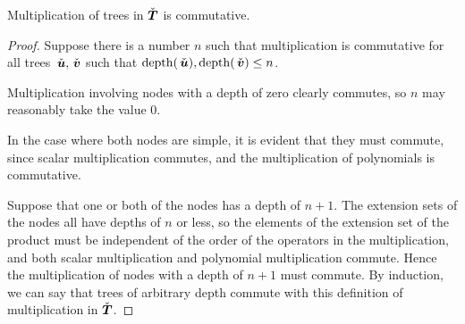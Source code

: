 

\begin{proposition}\label{TMcommutativity}
Multiplication of trees in $\check{\boldsymbol{T}}$ is commutative.
\begin{proof}
  Suppose there is a number $n$ such that multiplication is
  commutative for all trees $\,\check{\boldsymbol{u}}, \,\check{\boldsymbol{v}}$ such that
  $\operatorname{depth}(\,\check{\boldsymbol{u}}), \operatorname{depth}(\,\check{\boldsymbol{v}}) \le n$.


  Multiplication involving nodes with a depth of zero clearly commutes, so
  $n$ may reasonably take the value 0.

  In the case where both nodes are simple, it is evident that
  they must commute, since scalar multiplication commutes, and the
  multiplication of \polyrat polynomials is commutative.

  Suppose that one or both of the nodes has a depth of $n+1$. The
  extension sets of the nodes all have depths of $n$ or less, so the
  elements of the extension set of the product must be independent of
  the order of the operators in the multiplication, and both scalar
  multiplication and polynomial multiplication commute.  Hence the
  multiplication of nodes with a depth of $n+1$ must commute.  By
  induction, we can say that trees of arbitrary depth commute with
  this definition of multiplication in $\check{\boldsymbol{T}}$.
  \end{proof}
\end{proposition}

